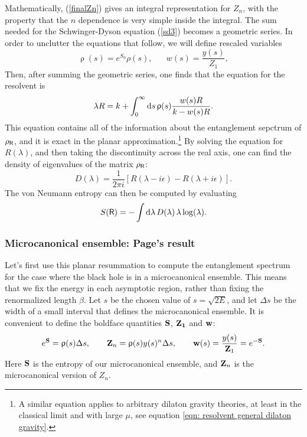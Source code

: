 \documentclass[11pt]{article}
\newcommand{\be}{\begin{equation}}
\newcommand{\ee}{\end{equation}}
\numberwithin{equation}{section}
\begin{document}
Mathematically, (\ref{finalZn}) gives an integral representation for $Z_n$, with the property that the $n$ dependence is very simple inside the integral. The sum needed for the Schwinger-Dyson equation (\ref{sd3}) becomes a geometric series. In order to unclutter the equations that follow, we will define rescaled variables
\be
\uprho(s) = e^{S_0}\rho(s), \hspace{20pt} w(s) = \frac{y(s)}{Z_1},\label{rescaledvariables}
\ee 
Then, after summing the geometric series, one finds that the equation for the resolvent is
\be
\lambda R=k+\int_0^\infty \mathrm{d}s\, \uprho(s) {w(s)R\over k- w(s)R}.
\label{eqn: resolvent eqn}
\ee
This equation contains all of the information about the entanglement sepctrum of $\rho_{\sf{R}}$, and it is exact in the planar approximation.\footnote{A similar equation applies to arbitrary dilaton gravity theories, at least in the classical limit and with large $\mu$, see equation \ref{eqn: resolvent general dilaton gravity}.} By solving the equation for $R(\lambda)$, and then taking the discontinuity across the real axis, one can find the density of eigenvalues of the matrix $\rho_{\sf{R}}$:
\be
D(\lambda) = \frac{1}{2\pi i}\left[R(\lambda-i\epsilon) - R(\lambda+i\epsilon)\right].\label{dos}
\ee
The von Neumann entropy can then be computed by evaluating
\be
S({\sf{R}}) = -\int \mathrm{d}\lambda\, D(\lambda)\, \lambda \log(\lambda).\label{vnEnt}
\ee



\subsubsection{Microcanonical ensemble: Page's result}
Let's first use this planar resummation to compute the entanglement spectrum for the case where the black hole is in a microcanonical ensemble. This means that we fix the energy in each asymptotic region, rather than fixing the renormalized length $\beta$. Let $s$ be the chosen value of $s = \sqrt{2E}$, and let $\Delta s$ be the width of a small interval that defines the microcanonical ensemble. It is convenient to define the boldface quantities ${\bf S}$, ${\bf{Z}_1}$ and ${\bf w}$:
\be
e^{\bf S} = \uprho(s) \Delta s, \hspace{20pt} {\bf Z}_n = \uprho(s)y(s)^n\Delta s, \hspace{20pt} {\bf w}(s) = \frac{y(s)}{{\bf Z}_1} = e^{-{\bf S}}.
\ee
Here ${\bf S}$ is the entropy of our microcanonical ensemble, and ${\bf Z}_n$ is the microcanonical version of $Z_n$.
\end{document}
